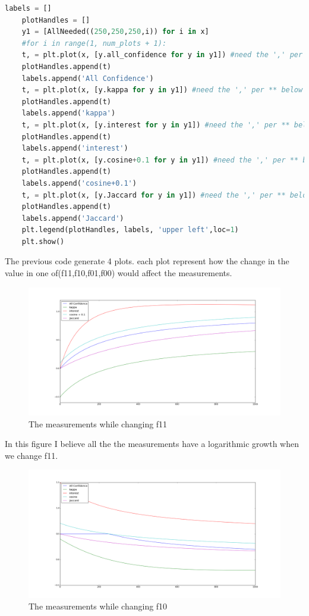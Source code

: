 \documentclass{article}
\begin{document}
\begin{lstlisting}[language = Python]
	labels = []
	plotHandles = []
	y1 = [AllNeeded((250,250,250,i)) for i in x]
	#for i in range(1, num_plots + 1):
	t, = plt.plot(x, [y.all_confidence for y in y1]) #need the ',' per ** below
	plotHandles.append(t)
	labels.append('All Confidence')
	t, = plt.plot(x, [y.kappa for y in y1]) #need the ',' per ** below
	plotHandles.append(t)
	labels.append('kappa')
	t, = plt.plot(x, [y.interest for y in y1]) #need the ',' per ** below
	plotHandles.append(t)
	labels.append('interest')
	t, = plt.plot(x, [y.cosine+0.1 for y in y1]) #need the ',' per ** below
	plotHandles.append(t)
	labels.append('cosine+0.1')
	t, = plt.plot(x, [y.Jaccard for y in y1]) #need the ',' per ** below
	plotHandles.append(t)
	labels.append('Jaccard')
	plt.legend(plotHandles, labels, 'upper left',loc=1)
	plt.show()
	\end{lstlisting}
	The previous code generate 4 plots. each plot represent how the change in the value in one of(f11,f10,f01,f00) would affect the measurements.
	\begin{figure}[H]
		\includegraphics[scale=0.35]{f11.png}
		\caption{The measurements while changing f11}
	\end{figure}
	In this figure I believe all the the measurements have a logarithmic growth when we change f11.
	\begin{figure}[H]
		\includegraphics[scale=0.35]{f10.png}
		\caption{The measurements while changing f10}
	\end{figure}
\end{document}
